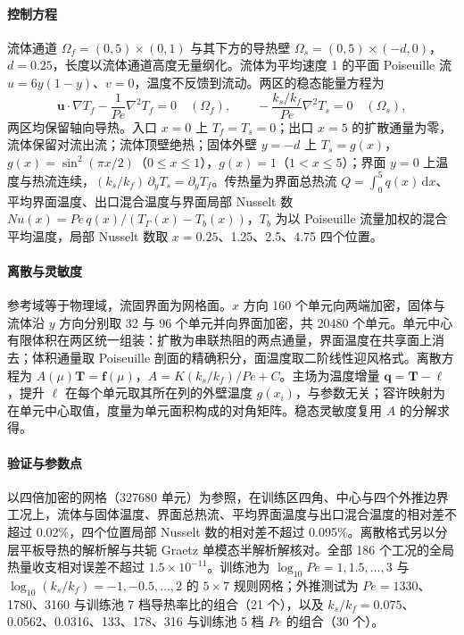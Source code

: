 \paragraph{控制方程}
流体通道 $\Omega_f=(0,5)\times(0,1)$ 与其下方的导热壁 $\Omega_s=(0,5)\times(-d,0)$，$d=0.25$，长度以流体通道高度无量纲化。流体为平均速度 1 的平面 Poiseuille 流 $u=6y(1-y)$、$v=0$，温度不反馈到流动。两区的稳态能量方程为
\begin{equation}
\mathbf u\cdot\nabla T_f-\frac1{Pe}\nabla^2T_f=0\quad(\Omega_f),\qquad
-\frac{k_s/k_f}{Pe}\nabla^2T_s=0\quad(\Omega_s),
\end{equation}
两区均保留轴向导热。入口 $x=0$ 上 $T_f=T_s=0$；出口 $x=5$ 的扩散通量为零，流体保留对流出流；流体顶壁绝热；固体外壁 $y=-d$ 上 $T_s=g(x)$，$g(x)=\sin^2(\pi x/2)$（$0\le x\le1$），$g(x)=1$（$1<x\le5$）；界面 $y=0$ 上温度与热流连续，$(k_s/k_f)\,\partial_yT_s=\partial_yT_f$。传热量为界面总热流 $Q=\int_0^5q(x)\,\mathrm dx$、平均界面温度、出口混合温度与界面局部 Nusselt 数 $Nu(x)=Pe\,q(x)/(T_\Gamma(x)-T_b(x))$，$T_b$ 为以 Poiseuille 流量加权的混合平均温度，局部 Nusselt 数取 $x=0.25$、1.25、2.5、4.75 四个位置。

\paragraph{离散与灵敏度}
参考域等于物理域，流固界面为网格面。$x$ 方向 160 个单元向两端加密，固体与流体沿 $y$ 方向分别取 32 与 96 个单元并向界面加密，共 20480 个单元。单元中心有限体积在两区统一组装：扩散为串联热阻的两点通量，界面温度在共享面上消去；体积通量取 Poiseuille 剖面的精确积分，面温度取二阶线性迎风格式。离散方程为 $A(\mu)\mathbf T=\mathbf f(\mu)$，$A=K(k_s/k_f)/Pe+C$。主场为温度增量 $\mathbf q=\mathbf T-\boldsymbol\ell$，提升 $\boldsymbol\ell$ 在每个单元取其所在列的外壁温度 $g(x_i)$，与参数无关；容许映射为在单元中心取值，度量为单元面积构成的对角矩阵。稳态灵敏度复用 $A$ 的分解求得。

\paragraph{验证与参数点}
以四倍加密的网格（327680 单元）为参照，在训练区四角、中心与四个外推边界工况上，流体与固体温度、界面总热流、平均界面温度与出口混合温度的相对差不超过 0.02\%，四个位置局部 Nusselt 数的相对差不超过 0.095\%。离散格式另以分层平板导热的解析解与共轭 Graetz 单模态半解析解核对。全部 186 个工况的全局热量收支相对误差不超过 $1.5\times10^{-11}$。训练池为 $\log_{10}Pe=1,1.5,\ldots,3$ 与 $\log_{10}(k_s/k_f)=-1,-0.5,\ldots,2$ 的 $5\times7$ 规则网格；外推测试为 $Pe=1330$、1780、3160 与训练池 7 档导热率比的组合（21 个），以及 $k_s/k_f=0.075$、0.0562、0.0316、133、178、316 与训练池 5 档 $Pe$ 的组合（30 个）。

